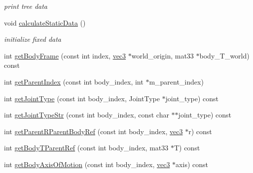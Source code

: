 \begin{CompactItemize}
\begin{CompactList}\small\item\em print tree data \item\end{CompactList}\item 
\hypertarget{classbt_inverse_dynamics_1_1_multi_body_tree_1_1_multi_body_impl_72bf41dcbbf7d8b5d2a17bbaaeaa5029}{
void \hyperlink{classbt_inverse_dynamics_1_1_multi_body_tree_1_1_multi_body_impl_72bf41dcbbf7d8b5d2a17bbaaeaa5029}{calculateStaticData} ()}
\label{classbt_inverse_dynamics_1_1_multi_body_tree_1_1_multi_body_impl_72bf41dcbbf7d8b5d2a17bbaaeaa5029}

\begin{CompactList}\small\item\em initialize fixed data \item\end{CompactList}\item 
int \hyperlink{classbt_inverse_dynamics_1_1_multi_body_tree_1_1_multi_body_impl_7396d5bfe0026ae4e79a01e24f7cd708}{getBodyFrame} (const int index, \hyperlink{classbt_inverse_dynamics_1_1vec3}{vec3} $\ast$world\_\-origin, mat33 $\ast$body\_\-T\_\-world) const 
\item 
int \hyperlink{classbt_inverse_dynamics_1_1_multi_body_tree_1_1_multi_body_impl_ce5ed2225ecc96810f7b385ada048dd6}{getParentIndex} (const int body\_\-index, int $\ast$m\_\-parent\_\-index)
\item 
int \hyperlink{classbt_inverse_dynamics_1_1_multi_body_tree_1_1_multi_body_impl_74c65f858a7a5c93466f6d02a23b4663}{getJointType} (const int body\_\-index, JointType $\ast$joint\_\-type) const 
\item 
int \hyperlink{classbt_inverse_dynamics_1_1_multi_body_tree_1_1_multi_body_impl_42b50ff5d4a4dad7687d8716e737cf04}{getJointTypeStr} (const int body\_\-index, const char $\ast$$\ast$joint\_\-type) const 
\item 
int \hyperlink{classbt_inverse_dynamics_1_1_multi_body_tree_1_1_multi_body_impl_92f65125b9ebf8c347e4f52df440f69b}{getParentRParentBodyRef} (const int body\_\-index, \hyperlink{classbt_inverse_dynamics_1_1vec3}{vec3} $\ast$r) const 
\item 
int \hyperlink{classbt_inverse_dynamics_1_1_multi_body_tree_1_1_multi_body_impl_e42c54a737ebba57e2d0e30f4cce7af4}{getBodyTParentRef} (const int body\_\-index, mat33 $\ast$T) const 
\item 
int \hyperlink{classbt_inverse_dynamics_1_1_multi_body_tree_1_1_multi_body_impl_3a0e4f72e0c1f41332e738014fd5f257}{getBodyAxisOfMotion} (const int body\_\-index, \hyperlink{classbt_inverse_dynamics_1_1vec3}{vec3} $\ast$axis) const 
$$
\end{CompactItemize}
